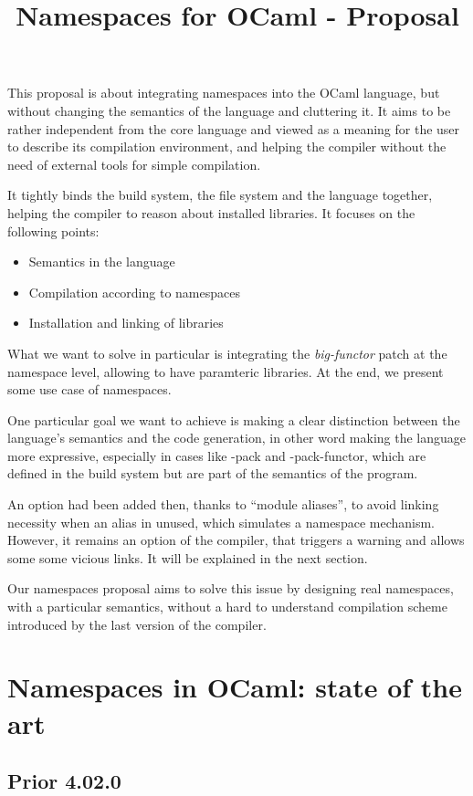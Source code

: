 \documentclass[11pt,a4paper]{article}
\title{Namespaces for OCaml - Proposal}
\begin{document}
\maketitle

This proposal is about integrating namespaces into the OCaml language, but
without changing the semantics of the language and cluttering it. It aims to be
rather independent from the core language and viewed as a meaning for the user to
describe its compilation environment, and helping the compiler without the need
of external tools for simple compilation.

It tightly binds the build system, the file system and the language together,
helping the compiler to reason about installed libraries.
It focuses on the following points:
\begin{itemize}
\item Semantics in the language
\item Compilation according to namespaces
\item Installation and linking of libraries
\end{itemize}

What we want to solve in particular is integrating the \emph{big-functor} patch
at the namespace level, allowing to have paramteric libraries. At the end, we
present some use case of namespaces.

One particular goal we want to achieve is making a clear distinction between the
language's semantics and the code generation, in other word making the language
more expressive, especially in cases like -pack and -pack-functor, which are
defined in the build system but are part of the semantics of the program.

An option had been added then, thanks to ``module aliases'', to avoid linking
necessity when an alias in unused, which simulates a namespace
mechanism. However, it remains an option of the compiler, that triggers a
warning and allows some some vicious links. It will be explained in the next
section.

Our namespaces proposal aims to solve this issue by designing real namespaces,
with a particular semantics, without a hard to understand compilation scheme
introduced by the last version of the compiler.

\section{Namespaces in OCaml: state of the art}

\subsection{Prior 4.02.0}
\end{document}

